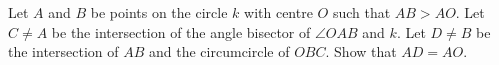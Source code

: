 Let $A$ and $B$ be points on the circle $k$ with centre $O$ such that $AB > AO$. Let $C\neq A$ be the intersection of the angle bisector of $\angle OAB$ and $k$. Let $D\neq B$ be the intersection of $AB$ and the circumcircle of $OBC$. Show that $AD = AO$.